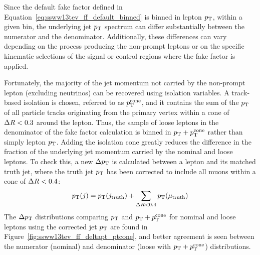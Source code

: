 Since the default fake factor defined in Equation~\ref{eq:ssww13tev_ff_default_binned} is binned in lepton $p_{\mathrm{T}}$, within a given bin, the underlying jet $p_{\mathrm{T}}$ spectrum can differ substantially between the numerator and the denominator.
Additionally, these differences can vary depending on the process producing the non-prompt leptons or on the specific kinematic selections of the signal or control regions where the fake factor is applied.

Fortunately, the majority of the jet momentum not carried by the non-prompt lepton (excluding neutrinos) can be recovered using isolation variables.
A track-based isolation is chosen, referred to as $p_{\mathrm{T}}^{\textrm{cone}}$, and it contains the sum of the $p_{\mathrm{T}}$ of all particle tracks originating from the primary vertex within a cone of $\Delta R < 0.3$ around the lepton.
Thus, the sample of loose leptons in the denominator of the fake factor calculation is binned in $p_{\mathrm{T}}+p_{\mathrm{T}}^{\textrm{cone}}$ rather than simply lepton $p_{\mathrm{T}}$.
Adding the isolation cone greatly reduces the difference in the fraction of the underlying jet momentum carried by the nominal and loose leptons.
To check this, a new $\Delta p_{\mathrm{T}}$ is calculated between a lepton and its matched truth jet, where the truth jet $p_{\mathrm{T}}$ has been corrected to include all muons within a cone of $\Delta R < 0.4$:
\begin{equation}
\pt(j) = \pt(j_{\textrm{truth}})+\sum\limits_{\deltar < 0.4}\pt(\mu_{\textrm{truth}})
\label{eq:ssww13tev_ff_jet_corr}
\end{equation}
The $\Delta p_{\mathrm{T}}$ distributions comparing $p_{\mathrm{T}}$ and $p_{\mathrm{T}}+p_{\mathrm{T}}^{\textrm{cone}}$ for nominal and loose leptons using the corrected jet $p_{\mathrm{T}}$ are found in Figure~\ref{fig:ssww13tev_ff_deltapt_ptcone}, and better agreement is seen between the numerator (nominal) and denominator (loose with $p_{\mathrm{T}}+p_{\mathrm{T}}^{\textrm{cone}}$) distributions.

